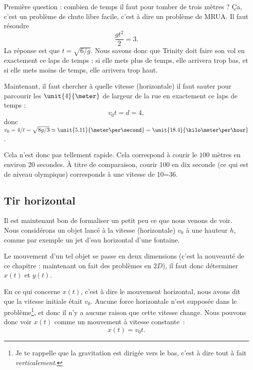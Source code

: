 Première question : combien de temps il faut pour tomber de trois mètres ? Ça, c'est un problème de chute libre facile, c'est à dire un problème de MRUA. Il faut résoudre
\begin{equation}
	\frac{ gt^2 }{ 2 }=3.
\end{equation}
La réponse est que $t=\sqrt{6/g}$. Nous savons donc que Trinity doit faire son vol en exactement ce laps de temps : si elle mets plus de temps, elle arrivera trop bas, et si elle mets moins de temps, elle arrivera trop haut.

Maintenant, il faut chercher à quelle vitesse (horizontale) il faut sauter pour parcourir les $\unit{4}{\meter}$ de largeur de la rue en exactement ce laps de temps :
\begin{equation}
	v_0t=d=4,
\end{equation}
donc $v_0=4/t=\sqrt{8g/3}\simeq \unit{5.11}{\meter\per\second}=\unit{18.4}{\kilo\meter\per\hour}$.

Cela n'est donc pas tellement rapide. Cela correspond à courir le $100$ mètres en environ $20$ secondes. À titre de comparaison, courir \unit{100}{\meter} en dix seconde (ce qui est de niveau olympique) corresponds à une vitesse de \unit{10}{\meter\per\second}=\unit{36}{\kilo\meter\per\hour}.

\subsection{Tir horizontal}

Il est maintenant bon de formaliser un petit peu ce que nous venons de voir. Nous considérons un objet lancé à la vitesse (horizontale) $v_0$ à une hauteur $h$, comme par exemple un jet d'eau horizontal d'une fontaine.

Le mouvement d'un tel objet se passe en deux dimensions (c'est la nouveauté de ce chapitre : maintenant on fait des problèmes en $2D$), il faut donc déterminer $x(t)$ et $y(t)$.

En ce qui concerne $x(t)$, c'est à dire le mouvement horizontal, nous avons dit que la vitesse initiale était $v_0$. Aucune force horizontale n'est supposée dans le problème\footnote{Je te rappelle que la gravitation est dirigée vers le bas, c'est à dire tout à fait \emph{verticalement}.}, et donc il n'y a aucune raison que cette vitesse change. Nous pouvons donc voir $x(t)$ comme un mouvement à vitesse constante~:
\begin{equation}		\label{Eqxtvt}
	x(t)=v_0t.
\end{equation}


